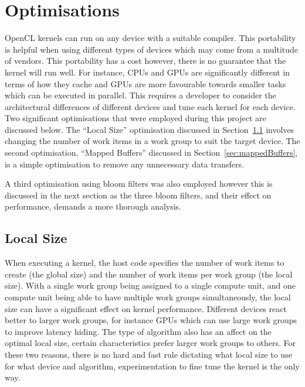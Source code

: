 \section{Optimisations}

OpenCL kernels can run on any device with a suitable compiler. This portability
is helpful when using different types of devices which may come from a multitude
of vendors. This portability has a cost however, there is no guarantee that the
kernel will run well. For instance, CPUs and GPUs are significantly different in
terms of how they cache and GPUs are more favourable towards smaller tasks which
can be executed in parallel. This requires a developer to consider the
architectural differences of different devices and tune each kernel for each
device. Two significant optimisations that were employed during this project are
discussed below. The ``Local Size'' optimisation discussed in
Section~\ref{sec:localSize} involves changing the number of work items in a work
group to suit the target device. The second optimisation, ``Mapped Buffers''
discussed in Section~\ref{sec:mappedBuffers}, is a simple optimisation to remove
any unnecessary data transfers.

A third optimisation using bloom filters was also employed however this is
discussed in the next section as the three bloom filters, and their effect on
performance, demands a more thorough analysis.

\subsection{Local Size}
\label{sec:localSize}

When executing a kernel, the host code specifies the number of work items to
create (the global size) and the number of work items per work group (the local
size). With a single work group being assigned to a single compute unit, and one
compute unit being able to have multiple work groups simultaneously, the local
size can have a significant effect on kernel performance. Different devices
react better to larger work groups, for instance GPUs which can use large work
groups to improve latency hiding. The type of algorithm also has an affect on
the optimal local size, certain characteristics prefer larger work groups to
others. For these two reasons, there is no hard and fast rule dictating what
local size to use for what device and algorithm, experimentation to fine tune
the kernel is the only way.

